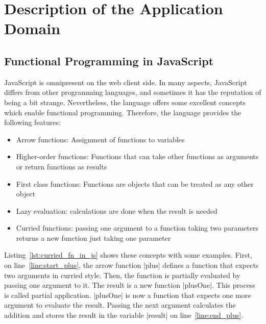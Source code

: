 \section{Description of the Application Domain}
\label{sec:Description of the Application Domain}
\subsection{Functional Programming in JavaScript}
\label{sub:Functional Programming in JavaScript}
JavaScript is omnipresent on the web client side. In many aspects, JavaScript
differs from other programming languages, and sometimes it has the reputation of
being a bit strange. Nevertheless, the language offers some excellent concepts
which enable functional programming. 
Therefore, the language provides the following features: 

\begin{itemize}
  \item{Arrow functions: Assignment of functions to variables} 
  \item{Higher-order functions: Functions that can take other functions as arguments or return functions as results}
  \item{First class functions: Functions are objects that can be treated as any other object}
  \item{Lazy evaluation: calculations are done when the result is needed}
  \item{Curried functions: passing one argument to a function taking two parameters returns a new function just taking one parameter}
\end{itemize}

Listing~\ref{lst:curried_fn_in_js} shows these concepts with some examples.
First, on line~\ref{line:start_plus}, the arrow function |plus| defines a function that expects two arguments in curried style.
Then, the function is partially evaluated by passing one argument to it. 
The result is a new function |plusOne|. This process is called partial application.
|plusOne| is now a function that expects one more argument
to evaluate the result. Passing the next argument calculates the addition and
stores the result in the variable |result| on line~\ref{line:end_plus}.
\\


